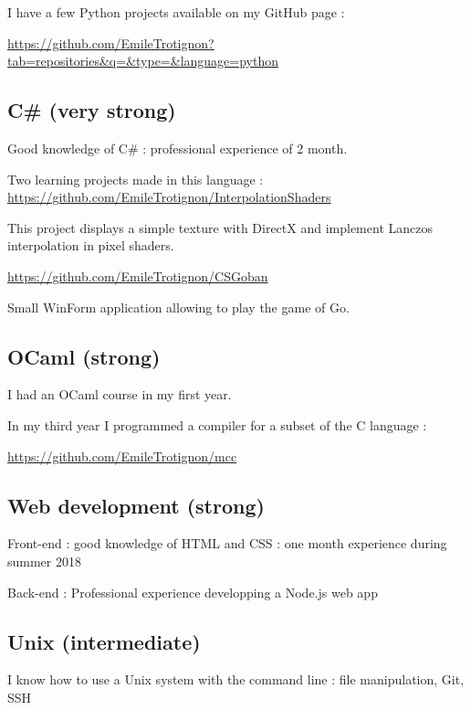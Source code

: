 \documentclass[10pt, a4paper, roman, french]{moderncv}
\begin{document}
                       I have a few Python projects available on my GitHub page : 

                       \url{https://github.com/EmileTrotignon?tab=repositories&q=&type=&language=python}
	
		\subsection{C\# (very strong)}
			Good knowledge of C\# : professional experience of 2 month.

                         Two learning projects made in this language :
                         \url{https://github.com/EmileTrotignon/InterpolationShaders}

This project displays a simple texture with DirectX and implement Lanczos interpolation in pixel shaders.

\url{https://github.com/EmileTrotignon/CSGoban}

Small WinForm application allowing to play the game of Go.
	
		\subsection{OCaml (strong)}
			I had an OCaml course in my first year. 
                
                         In my third year I programmed a compiler for a subset of the C language :

                         \url{https://github.com/EmileTrotignon/mcc}
	
		\subsection{Web development (strong)}
			Front-end : good knowledge of HTML and CSS : one month experience during summer 2018

                         Back-end : Professional experience developping a Node.js web app
	
		\subsection{Unix (intermediate)}
			I know how to use a Unix system with the command line : file manipulation, Git, SSH
	
\end{document}
